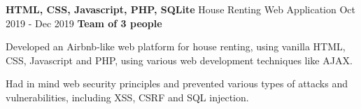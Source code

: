 \cventry
  {\textbf{HTML, CSS, Javascript, PHP, SQLite}}
  {House Renting Web Application \href{https://github.com/EduRibeiro00/AgencyTravels-feup-ltw}{\faExternalLink}} %
  {Oct 2019 - Dec 2019}
  {\textbf{Team of 3 people}}
  {
    \begin{cvitems} %
      \item {Developed an Airbnb-like web platform for house renting, using vanilla HTML, CSS, Javascript and PHP, using various web development techniques like AJAX.}
      \item {Had in mind web security principles and prevented various types of attacks and vulnerabilities, including XSS, CSRF and SQL injection.}
    \end{cvitems}
  }